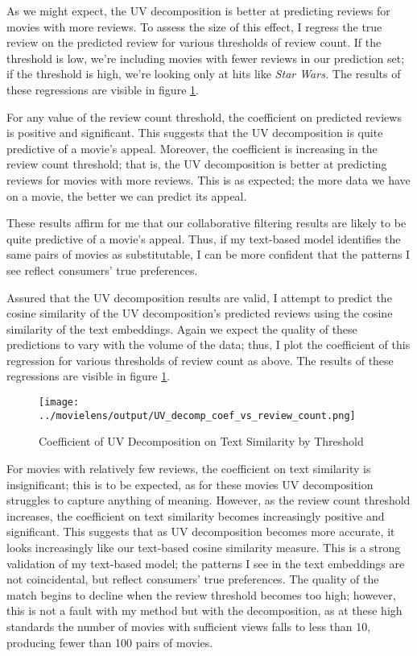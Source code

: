 \documentclass{article}
\begin{document}
As we might expect, the UV decomposition is better at predicting reviews for movies with more reviews. To assess the size of this effect, I regress the true review on the predicted review for various thresholds of review count. If the threshold is low, we're including movies with fewer reviews in our prediction set; if the threshold is high, we're looking only at hits like \emph{Star Wars.} The results of these regressions are visible in figure \ref{fig:uv_threshold}.

For any value of the review count threshold, the coefficient on predicted reviews is positive and significant. This suggests that the UV decomposition is quite predictive of a movie's appeal. Moreover, the coefficient is increasing in the review count threshold; that is, the UV decomposition is better at predicting reviews for movies with more reviews. This is as expected; the more data we have on a movie, the better we can predict its appeal.

These results affirm for me that our collaborative filtering results are likely to be quite predictive of a movie's appeal. Thus, if my text-based model identifies the same pairs of movies as substitutable, I can be more confident that the patterns I see reflect consumers' true preferences. 

Assured that the UV decomposition results are valid, I attempt to predict the cosine similarity of the UV decomposition's predicted reviews using the cosine similarity of the text embeddings. Again we expect the quality of these predictions to vary with the volume of the data; thus, I plot the coefficient of this regression for various thresholds of review count as above. The results of these regressions are visible in figure \ref{fig:uv_threshold}.

\begin{figure}
    \begin{center}
    \texttt{[image: ../movielens/output/UV\_decomp\_coef\_vs\_review\_count.png]}
    \caption{Coefficient of UV Decomposition on Text Similarity by Threshold}
    \label{fig:uv_threshold}
    \end{center}
\end{figure}

For movies with relatively few reviews, the coefficient on text similarity is insignificant; this is to be expected, as for these movies UV decomposition struggles to capture anything of meaning. However, as the review count threshold increases, the coefficient on text similarity becomes increasingly positive and significant. This suggests that as UV decomposition becomes more accurate, it looks increasingly like our text-based cosine similarity measure. This is a strong validation of my text-based model; the patterns I see in the text embeddings are not coincidental, but reflect consumers' true preferences. The quality of the match begins to decline when the review threshold becomes too high; however, this is not a fault with my method but with the decomposition, as at these high standards the number of movies with sufficient views falls to less than 10, producing fewer than 100 pairs of movies. 
\end{document}
